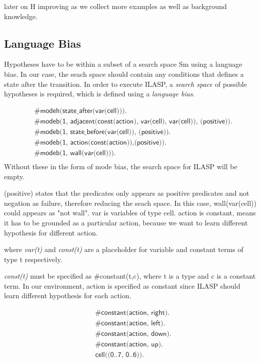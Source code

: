 later on H improving as we collect more examples as well as background knowledge.

\subsection{Language Bias}
\label{subsec:language_bias}

Hypotheses have to be within a subset of a search space Sm using a language bias. In our case, the seach space should contain any conditions that defines a state after the transition.
In order to execute ILASP, a \textit{search space} of possible hypotheses is required, which is defined using a \textit{language bias}.

\begin{equation}
\begin{split}
&\textsf{\#modeh(state\_after(var(cell))).}\\
&\textsf{\#modeb(1, adjacent(const(action), var(cell), var(cell)), (positive)).} \\
&\textsf{\#modeb(1, state\_before(var(cell)), (positive)).} \\
&\textsf{\#modeb(1, action(const(action)),(positive)).} \\
&\textsf{\#modeb(1, wall(var(cell))).} \\
\end{split}
\end{equation}
Without these in the form of mode bias, the search space for ILASP will be empty.

(positive) states that the predicates only appears as positive predicates and not negation as failure, therefore reducing the seach space. In this case, wall(var(cell)) could appears as "not wall". 
var is variables of type cell. 
action is constant, means it has to be grounded as a particular action, because we want to learn different hypothesis for different action. 

where \textit{var(t)} and \textit{const(t)} are a placeholder for variable and constant terms of type t respectively.

\textit{const(t)} must be specified as \#constant(t,c), where t is a type and c is a constant term.
In our environment, action is specified as constant since ILASP should learn different hypothesis for each action.

\begin{equation}
\begin{split}
&\textsf{\#constant(action, right).}\\
&\textsf{\#constant(action, left).}\\
&\textsf{\#constant(action, down).}\\
&\textsf{\#constant(action, up).}\\
&\textsf{cell((0..7, 0..6)).}
\end{split}
\end{equation}

